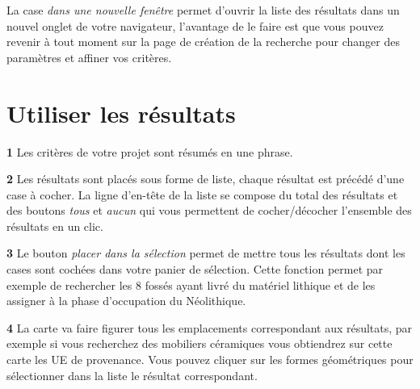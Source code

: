 \documentclass[letterpaper,10pt,french]{sphinxmanual}
\begin{document}
La case \emph{dans une nouvelle fenêtre} permet d'ouvrir la liste des résultats dans un nouvel onglet de votre navigateur, l'avantage de le faire est que vous pouvez revenir à tout moment sur la page de création de la recherche pour changer des paramètres et affiner vos critères.


\section{Utiliser les résultats}
\label{manuel/formulaire_recherche:recherche-utilisation}\label{manuel/formulaire_recherche:utiliser-les-resultats}\begin{figure}[htbp]
\centering

\end{figure}

\textbf{1} Les critères de votre projet sont résumés en une phrase.

\textbf{2} Les résultats sont placés sous forme de liste, chaque résultat est précédé d'une case à cocher. La ligne d'en-tête de la liste se compose du total des résultats et des boutons \emph{tous} et \emph{aucun} qui vous permettent de cocher/décocher l'ensemble des résultats en un clic.

\textbf{3} Le bouton \emph{placer dans la sélection} permet de mettre tous les résultats dont les cases sont cochées dans votre panier de sélection. Cette fonction permet par exemple de rechercher les 8 fossés ayant livré du matériel lithique et de les assigner à la phase d'occupation du Néolithique.

\textbf{4} La carte va faire figurer tous les emplacements correspondant aux résultats, par exemple si vous recherchez des mobiliers céramiques vous obtiendrez sur cette carte les UE de provenance. Vous pouvez cliquer sur les formes géométriques pour sélectionner dans la liste le résultat correspondant.
\end{document}
